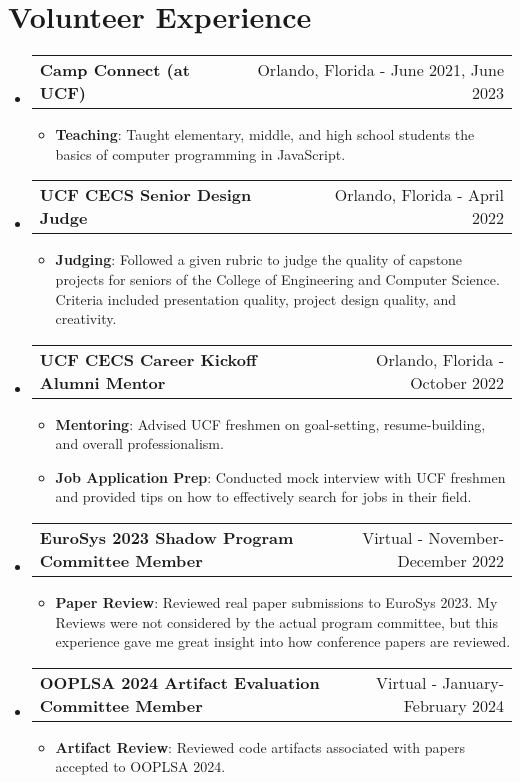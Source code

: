 \documentclass{article}
\makeatletter
\newcommand{\resumeItem}[2]{
  \item\small{
    \textbf{#1}{: #2 \vspace{-2pt}}
  }
}
\newcommand{\volunteeringItem}[2]{
  \vspace{-1pt}\item
    \begin{tabular*}{0.97\textwidth}{l@{\extracolsep{\fill}}r}
      \textbf{#1} & #2 \vspace{-2pt} \\
    \end{tabular*}\vspace{-5pt}
}
\newcommand{\resumeSubHeadingListStart}{\begin{itemize}[leftmargin=*, label={}]}
\newcommand{\resumeSubHeadingListEnd}{\end{itemize}}
\newcommand{\resumeItemListStart}{\begin{itemize}}
\newcommand{\resumeItemListEnd}{\end{itemize}\vspace{-5pt}}
\makeatother
\begin{document}
\vspace{-5pt}
\section{Volunteer Experience}
\resumeSubHeadingListStart{}
\volunteeringItem{Camp Connect (at UCF)}
{Orlando, Florida {-} June 2021, June 2023}
\resumeItemListStart{}
\resumeItem{Teaching}
{Taught elementary, middle, and high school students the basics of computer
	programming in JavaScript.}
\resumeItemListEnd{}

\vspace{2pt}
\volunteeringItem{UCF CECS Senior Design Judge}
{Orlando, Florida {-} April 2022}
\resumeItemListStart{}
\resumeItem{Judging}
{Followed a given rubric to judge the quality of capstone projects for seniors of the College of Engineering and Computer Science.
	Criteria included presentation quality, project design quality, and creativity.}
\resumeItemListEnd{}

\vspace{2pt}
\volunteeringItem{UCF CECS Career Kickoff Alumni Mentor}
{Orlando, Florida {-} October 2022}
\resumeItemListStart{}
\resumeItem{Mentoring}
{Advised UCF freshmen on goal-setting, resume-building, and overall professionalism.}
\resumeItem{Job Application Prep}
{Conducted mock interview with UCF freshmen and provided tips on how to effectively search for jobs in their field.}
\resumeItemListEnd{}

\vspace{2pt}
\volunteeringItem{EuroSys 2023 Shadow Program Committee Member}
{Virtual {-} November-December 2022}
\resumeItemListStart{}
\resumeItem{Paper Review}
{Reviewed real paper submissions to EuroSys 2023.
	My Reviews were not considered by the actual program committee, but this experience gave me great insight into how conference papers are reviewed.}
\resumeItemListEnd{}

\vspace{2pt}
\volunteeringItem{OOPLSA 2024 Artifact Evaluation Committee Member}
{Virtual {-} January-February 2024}
\resumeItemListStart{}
\resumeItem{Artifact Review}
{Reviewed code artifacts associated with papers accepted to OOPLSA 2024.}
\resumeItemListEnd{}

\resumeSubHeadingListEnd{}
\end{document}
